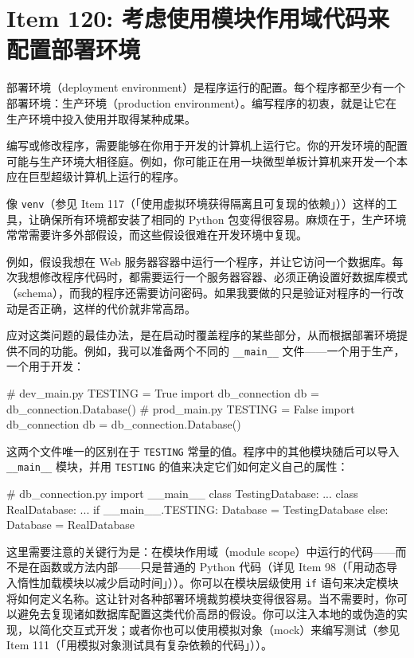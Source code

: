 \section{Item 120: 考虑使用模块作用域代码来配置部署环境}

部署环境（deployment environment）是程序运行的配置。每个程序都至少有一个部署环境：生产环境（production environment）。编写程序的初衷，就是让它在生产环境中投入使用并取得某种成果。

编写或修改程序，需要能够在你用于开发的计算机上运行它。你的开发环境的配置可能与生产环境大相径庭。例如，你可能正在用一块微型单板计算机来开发一个本应在巨型超级计算机上运行的程序。

像 \texttt{venv}（参见 Item 117（「使用虚拟环境获得隔离且可复现的依赖」））这样的工具，让确保所有环境都安装了相同的 Python 包变得很容易。麻烦在于，生产环境常常需要许多外部假设，而这些假设很难在开发环境中复现。

例如，假设我想在 Web 服务器容器中运行一个程序，并让它访问一个数据库。每次我想修改程序代码时，都需要运行一个服务器容器、必须正确设置好数据库模式（schema），而我的程序还需要访问密码。如果我要做的只是验证对程序的一行改动是否正确，这样的代价就非常高昂。

应对这类问题的最佳办法，是在启动时覆盖程序的某些部分，从而根据部署环境提供不同的功能。例如，我可以准备两个不同的 \texttt{\_\_main\_\_} 文件——一个用于生产，一个用于开发：

\begin{codebox}[python]
# dev_main.py
TESTING = True
import db_connection
db = db_connection.Database()
# prod_main.py
TESTING = False
import db_connection
db = db_connection.Database()
\end{codebox}

这两个文件唯一的区别在于 \texttt{TESTING} 常量的值。程序中的其他模块随后可以导入 \texttt{\_\_main\_\_} 模块，并用 \texttt{TESTING} 的值来决定它们如何定义自己的属性：

\begin{codebox}[python]
# db_connection.py
import __main__
class TestingDatabase:
    ...
class RealDatabase:
    ...
if __main__.TESTING:
    Database = TestingDatabase
else:
    Database = RealDatabase
\end{codebox}

这里需要注意的关键行为是：在模块作用域（module scope）中运行的代码——而不是在函数或方法内部——只是普通的 Python 代码（详见 Item 98（「用动态导入惰性加载模块以减少启动时间」））。你可以在模块层级使用 \texttt{if} 语句来决定模块将如何定义名称。这让针对各种部署环境裁剪模块变得很容易。当不需要时，你可以避免去复现诸如数据库配置这类代价高昂的假设。你可以注入本地的或伪造的实现，以简化交互式开发；或者你也可以使用模拟对象（mock）来编写测试（参见 Item 111（「用模拟对象测试具有复杂依赖的代码」））。

